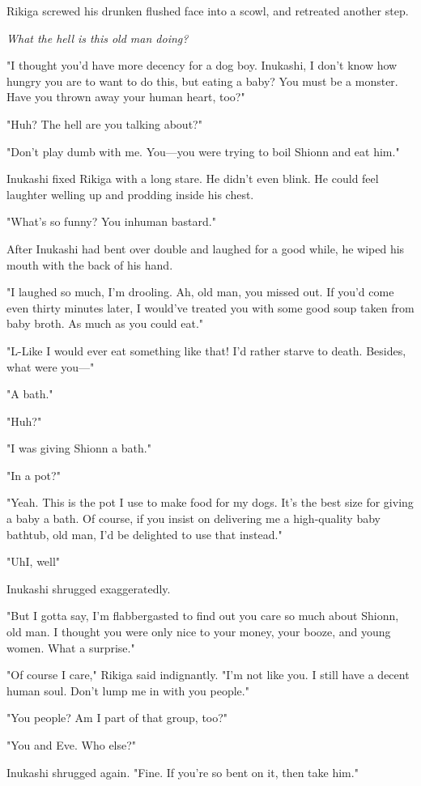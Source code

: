 Rikiga screwed his drunken flushed face into a scowl, and retreated
another step.

\emph{What the hell is this old man doing?}

"I thought you'd have more decency for a dog boy. Inukashi, I don't know
how hungry you are to want to do this, but eating a baby? You must be a
monster. Have you thrown away your human heart, too?"

"Huh? The hell are you talking about?"

"Don't play dumb with me. You---you were trying to boil Shionn and eat
him."

Inukashi fixed Rikiga with a long stare. He didn't even blink. He could
feel laughter welling up and prodding inside his chest.

"What's so funny? You inhuman bastard."

After Inukashi had bent over double and laughed for a good while, he
wiped his mouth with the back of his hand.

"I laughed so much, I'm drooling. Ah, old man, you missed out. If you'd
come even thirty minutes later, I would've treated you with some good
soup taken from baby broth. As much as you could eat."

"L-Like I would ever eat something like that! I'd rather starve to
death. Besides, what were you---"

"A bath."

"Huh?"

"I was giving Shionn a bath."

"In a pot?"

"Yeah. This is the pot I use to make food for my dogs. It's the best
size for giving a baby a bath. Of course, if you insist on delivering me
a high-quality baby bathtub, old man, I'd be delighted to use that
instead."

"Uh\el I, well\el "

Inukashi shrugged exaggeratedly.

"But I gotta say, I'm flabbergasted to find out you care so much about
Shionn, old man. I thought you were only nice to your money, your booze,
and young women. What a surprise."

"Of course I care," Rikiga said indignantly. "I'm not like you. I still
have a decent human soul. Don't lump me in with you people."

"You people? Am I part of that group, too?"

"You and Eve. Who else?"

Inukashi shrugged again. "Fine. If you're so bent on it, then take him."

